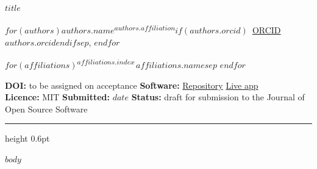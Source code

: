 \documentclass[10pt,a4paper,onecolumn]{article}
\begin{document}
{\sffamily\bfseries\LARGE\color{jossblue}\raggedright $title$\par}
\vspace{0.9em}
{\large $for(authors)$$authors.name$\textsuperscript{$authors.affiliation$}$if(authors.orcid)$~\href{https://orcid.org/$authors.orcid$}{\textcolor{jossblue}{\footnotesize\sffamily ORCID $authors.orcid$}}$endif$$sep$, $endfor$\par}
\vspace{0.35em}
{\small\color{muted}$for(affiliations)$\textsuperscript{$affiliations.index$}\,$affiliations.name$$sep$ \quad $endfor$\par}
\vspace{0.6em}
\begin{minipage}{\linewidth}\sffamily\footnotesize\color{muted}
\textbf{DOI:} to be assigned on acceptance \quad
\textbf{Software:} \href{https://github.com/pulakeshpradhan/geosurvey}{Repository} \textbullet{} \href{https://pulakeshpradhan.github.io/geosurvey/}{Live app}\\
\textbf{Licence:} MIT \quad \textbf{Submitted:} $date$ \quad \textbf{Status:} draft for submission to the Journal of Open Source Software
\end{minipage}
\vspace{0.4em}\hrule height 0.6pt \relax\vspace{0.9em}

$body$
\end{document}
